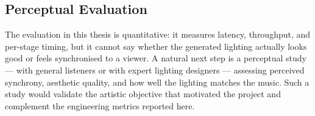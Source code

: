\subsection{Perceptual Evaluation}

The evaluation in this thesis is quantitative: it measures latency, throughput, and per-stage timing, but it cannot say whether the generated lighting actually looks good or feels synchronised to a viewer. A natural next step is a perceptual study --- with general listeners or with expert lighting designers --- assessing perceived synchrony, aesthetic quality, and how well the lighting matches the music. Such a study would validate the artistic objective that motivated the project and complement the engineering metrics reported here.
